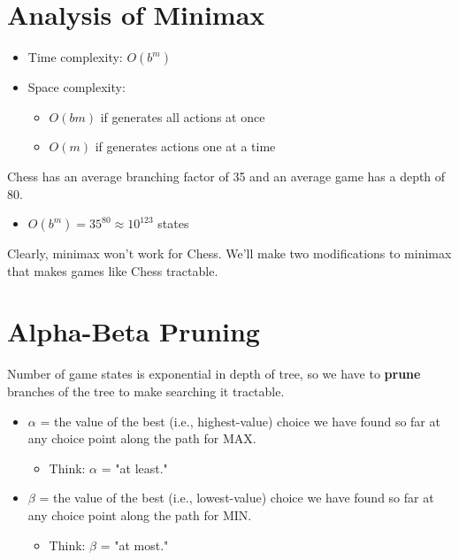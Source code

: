 \documentclass[11pt]{article}
\begin{document}
\section{Analysis of Minimax}
\label{sec:org906a757}

\begin{itemize}
\item Time complexity: \(O(b^m)\)
\item Space complexity:

\begin{itemize}
\item \(O(bm)\) if generates all actions at once
\item \(O(m)\) if generates actions one at a time
\end{itemize}
\end{itemize}

Chess has an average branching factor of 35 and an average game has a depth of 80.

\begin{itemize}
\item \(O(b^m) = 35^{80} \approx 10^{123}\) states
\end{itemize}

Clearly, minimax won't work for Chess.  We'll make two modifications to minimax that makes games like Chess tractable.
\section{Alpha-Beta Pruning}
\label{sec:orgef06c78}

Number of game states is exponential in depth of tree, so we have to \textbf{prune} branches of the tree to make searching it tractable.


\begin{itemize}
\item \(\alpha\) = the value of the best (i.e., highest-value) choice we have found so far at any choice point along the path for MAX.

\begin{itemize}
\item Think: \(\alpha\) = "at least."
\end{itemize}

\item \(\beta\) = the value of the best (i.e., lowest-value) choice we have found so far at any choice point along the path for MIN.

\begin{itemize}
\item Think: \(\beta\) = "at most."
\end{itemize}
\end{itemize}
\end{document}
